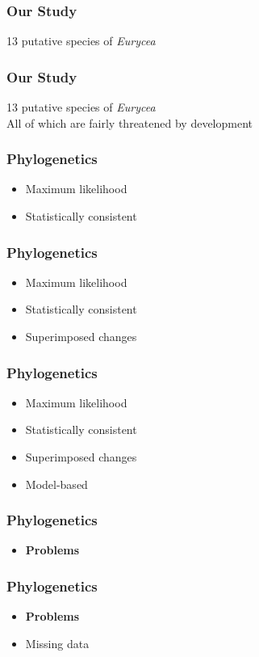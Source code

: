 \documentclass{beamer}
\begin{document}
\begin{frame}
\frametitle{Our Study}
13 putative species of \textit{Eurycea}
\end{frame}

\begin{frame}
\frametitle{Our Study}
13 putative species of \textit{Eurycea} \\
All of which are fairly threatened by development
\end{frame}

\begin{frame}
\frametitle{Phylogenetics}
\begin{itemize}
\item Maximum likelihood
\item Statistically consistent
\end{itemize}
\end{frame}

\begin{frame}
\frametitle{Phylogenetics}
\begin{itemize}
\item Maximum likelihood
\item Statistically consistent
\item Superimposed changes
\end{itemize}
\end{frame}

\begin{frame}
\frametitle{Phylogenetics}
\begin{itemize}
\item Maximum likelihood
\item Statistically consistent
\item Superimposed changes
\item Model-based 
\end{itemize}
\end{frame}

\begin{frame}
\frametitle{Phylogenetics}
\begin{itemize}
\item \textbf{Problems}
\end{itemize}
\end{frame}

\begin{frame}
\frametitle{Phylogenetics}
\begin{itemize}
\item \textbf{Problems}
\item Missing data
\end{itemize}
\end{frame}
\end{document}
